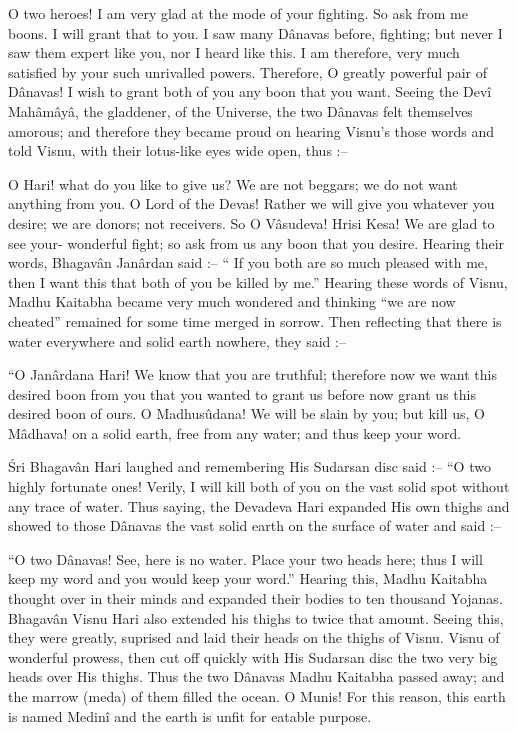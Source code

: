 O two heroes! I am very glad at the mode of your fighting. So ask from me boons. I will grant that to you. I saw many D\^anavas before, fighting; but never I saw them expert like you, nor I heard like this. I am therefore, very much satisfied by your such unrivalled powers. Therefore, O greatly powerful pair of D\^anavas! I wish to grant both of you any boon that you want. Seeing the Dev\^i Mah\^am\^ay\^a, the gladdener, of the Universe, the two D\^anavas felt themselves amorous; and therefore they became proud on hearing Visnu's those words and told Visnu, with their lotus-like eyes wide open, thus :--

O Hari! what do you like to give us? We are not beggars; we do not want anything from you. O Lord of the Devas! Rather we will give you whatever you desire; we are donors; not receivers. So O V\^asudeva! Hrisi Kesa! We are glad to see your- wonderful fight; so ask from us any boon that you desire. Hearing their words, Bhagav\^an Jan\^ardan said :-- `` If you both are so much pleased with me, then I want this that both of you be killed by me.'' Hearing these words of Visnu, Madhu Kaitabha became very much wondered and thinking ``we are now cheated'' remained for some time merged in sorrow. Then reflecting that there is water everywhere and solid earth nowhere, they said :--

``O Jan\^ardana Hari! We know that you are truthful; therefore now we want this desired boon from you that you wanted to grant us before now grant us this desired boon of ours. O Madhus\^udana! We will be slain by you; but kill us, O M\^adhava! on a solid earth, free from any water; and thus keep your word.

\'Sri Bhagav\^an Hari laughed and remembering His Sudarsan disc said :-- ``O two highly fortunate ones! Verily, I will kill both of you on the vast solid spot without any trace of water. Thus saying, the Devadeva Hari expanded His own thighs and showed to those D\^anavas the vast solid earth on the surface of water and said :--

``O two D\^anavas! See, here is no water. Place your two heads here; thus I will keep my word and you would keep your word.'' Hearing this, Madhu Kaitabha thought over in their minds and expanded their bodies to ten thousand Yojanas. Bhagav\^an Visnu Hari also extended his thighs to twice that amount. Seeing this, they were greatly, suprised and laid their heads on the thighs of Visnu. Visnu of wonderful prowess, then cut off quickly with His Sudarsan disc the two very big heads over His thighs. Thus the two D\^anavas Madhu Kaitabha passed away; and the marrow (meda) of them filled the ocean. O Munis! For this reason, this earth is named Medin\^i and the earth is unfit for eatable purpose.

